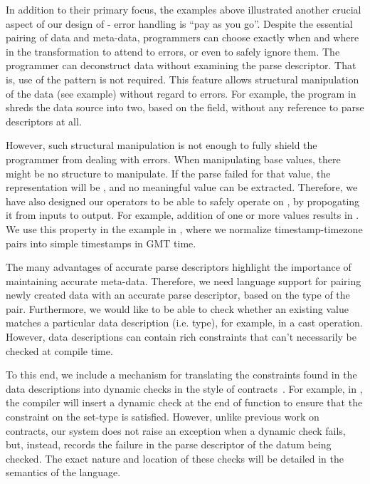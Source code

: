 \documentclass{entcs}
\begin{document}
In addition to their primary focus, the examples above illustrated
another crucial aspect of our design of \datatype{} - error handling
is ``pay as you go''.  Despite the essential pairing of data and
meta-data, programmers can choose exactly when and where in the
transformation to attend to errors, or even to safely ignore them. The
programmer can deconstruct data without examining the parse
descriptor. That is, use of the pattern  is not
required. This feature allows structural manipulation of the data (see
\darkstar{} example) without regard to errors. For example, the
program in  shreds the \darkstar{} data
source into two, based on the  field, without any reference to
parse descriptors at all.

However, such structural manipulation is not enough to fully shield
the programmer from dealing with errors. When manipulating base
values, there might be no structure to manipulate. If the parse failed
for that value, the representation will be \bottom{}, and no
meaningful value can be extracted. Therefore, we have also designed
our operators to be able to safely operate on \bottom{}, by
propogating it from inputs to output. For example, addition of one or
more \bottom{} values results in \bottom{}. We use this property in
the example in , where we normalize
timestamp-timezone pairs into simple timestamps in GMT time.

The many advantages of accurate parse descriptors highlight the
importance of maintaining accurate meta-data. Therefore, we need
language support for pairing newly created data with an accurate parse
descriptor, based on the type of the pair. Furthermore, we would like
to be able to check whether an existing value matches a particular
data description (i.e. type), for example, in a cast operation.
However, data descriptions can contain rich constraints that can't
necessarily be checked at compile time.

To this end, we include a mechanism for translating the constraints
found in the data descriptions into dynamic checks in the style of
contracts~\cite{contracts}. For example, in
, the compiler will insert a dynamic check
at the end of function  to ensure that the constraint
on the set-type is satisfied. However, unlike previous work on
contracts, our system does not raise an exception when a dynamic check
fails, but, instead, records the failure in the parse descriptor of
the datum being checked.  The exact nature and location of these
checks will be detailed in the semantics of the language.
\end{document}
